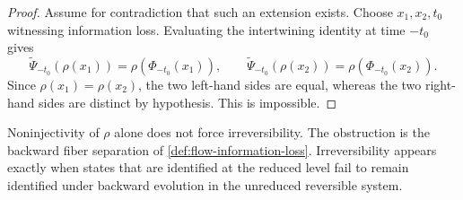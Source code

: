 \begin{proof}
	Assume for contradiction that such an extension exists.
	Choose \(x_1,x_2,t_0\) witnessing information loss. Evaluating the
	intertwining identity at time \(-t_0\) gives
	\[
		\widetilde\Psi_{-t_0}(\rho(x_1))
		=
		\rho(\Phi_{-t_0}(x_1)),
		\qquad
		\widetilde\Psi_{-t_0}(\rho(x_2))
		=
		\rho(\Phi_{-t_0}(x_2)).
	\]
	Since \(\rho(x_1)=\rho(x_2)\), the two left-hand sides are equal,
	whereas the two right-hand sides are distinct by hypothesis. This is
	impossible.
\end{proof}
\begin{remark}
	Noninjectivity of \(\rho\) alone does not force irreversibility.
	The obstruction is the backward fiber separation of
	\cref{def:flow-information-loss}. Irreversibility appears exactly when
	states that are identified at the reduced level fail to remain
	identified under backward evolution in the unreduced reversible system.
\end{remark}
